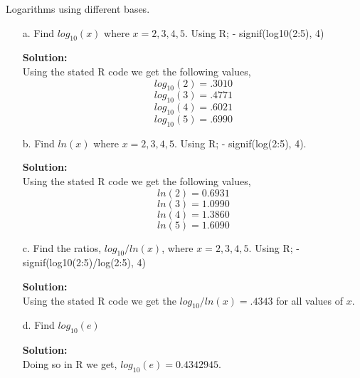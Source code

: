 \documentclass[12pt]{article}
\makeatletter
\theoremstyle{homework}
\newenvironment{exercise}[1]
{\def\@currentlabel{#1}\exercisecore}
{\endexercisecore}
\newcommand{\localhead}[1]{\par\smallskip\noindent\textbf{#1}\nobreak\\}%
\newcommand\solution{\localhead{Solution:}}
\makeatother
\begin{document}
\begin{exercise}{7} Logarithms using different bases.\\
  \begin{enumerate}
    \item[a.] Find $log_{10}(x)$ where $x = 2, 3, 4, 5$. Using R; - signif(log10(2:5), 4)\\
    \solution Using the stated R code we get the following values, 
    \begin{equation*}
      log_{10}(2) = .3010
    \end{equation*}
    \begin{equation*}
      log_{10}(3) = .4771
    \end{equation*} 
    \begin{equation*}
      log_{10}(4) = .6021
    \end{equation*} 
    \begin{equation*}
      log_{10}(5) = .6990
    \end{equation*} 
    \vspace{.15in}

    \item[b.] Find $ln(x)$ where $x = 2, 3, 4, 5$. Using R; - signif(log(2:5), 4).\\
    \solution Using the stated R code we get the following values, 
    \begin{equation*}
      ln(2) =  0.6931 
    \end{equation*}
    \begin{equation*}
      ln(3) = 1.0990 
    \end{equation*} 
    \begin{equation*}
      ln(4) = 1.3860 
    \end{equation*} 
    \begin{equation*}
      ln(5) = 1.6090
    \end{equation*} 
    \vspace{.15in}


    \item[c.] Find the ratios, $log_{10}/ln(x)$, where  $x = 2, 3, 4, 5$. Using R; -  signif(log10(2:5)/log(2:5), 4)\\
    \solution Using the stated R code we get the $log_{10}/ln(x) = .4343$ for all values of $x$. 
    \vspace{.15in}

    \item[d.] Find $log_{10}(e)$\\
    \solution Doing so in R we get, $log_{10}(e) = 0.4342945$. 
    \vspace{.15in}


\end{enumerate}
\end{exercise}
\end{document}
